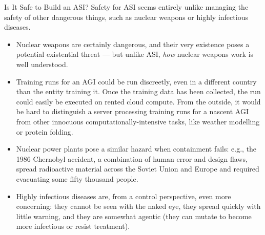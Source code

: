\documentclass[aspectratio=169,10pt]{beamer}
\begin{document}
\begin{frame}{Is It Safe to Build an ASI?}
  Safety for ASI seems entirely unlike managing the safety of other
  dangerous things, such as nuclear weapons or highly infectious diseases.

  \begin{itemize}
    \item Nuclear weapons are certainly dangerous, and their very
      existence poses a potential existential threat --- but unlike ASI,
      \emph{how} nuclear weapons work is well understood.
    \item Training runs for an AGI could be run discreetly, even in a
      different country than the entity training it. Once the training
      data has been collected, the run could easily be executed on rented
      cloud compute. From the outside, it would be hard to distinguish a
      server processing training runs for a nascent AGI from other
      innocuous computationally-intensive tasks, like weather modelling or
      protein folding.
    \item Nuclear power plants pose a similar hazard when containment
      fails: e.g., the 1986 Chernobyl accident, a combination of human
      error and design flaws, spread radioactive material across the
      Soviet Union and Europe and required evacuating some fifty thousand
      people.
    \item Highly infectious diseases are, from a control perspective, even
      more concerning: they cannot be seen with the naked eye, they spread
      quickly with little warning, and they are somewhat agentic (they can
      mutate to become more infectious or resist treatment).
  \end{itemize}
\end{frame}
\end{document}
